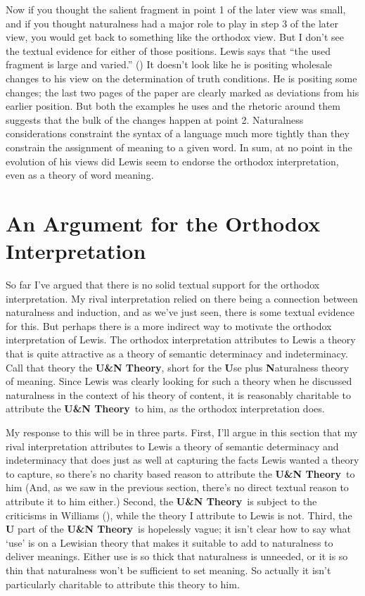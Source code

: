 \documentclass[
  11pt,
  letterpaper,
  DIV=11,
  numbers=noendperiod,
  twoside]{scrartcl}
\begin{document}
Now if you thought the salient fragment in point 1 of the later view was
small, and if you thought naturalness had a major role to play in step 3
of the later view, you would get back to something like the orthodox
view. But I don't see the textual evidence for either of those
positions. Lewis says that ``the used fragment is large and varied.''
() It doesn't look like he is
positing wholesale changes to his view on the determination of truth
conditions. He is positing some changes; the last two pages of the paper
are clearly marked as deviations from his earlier position. But both the
examples he uses and the rhetoric around them suggests that the bulk of
the changes happen at point 2. Naturalness considerations constraint the
syntax of a language much more tightly than they constrain the
assignment of meaning to a given word. In sum, at no point in the
evolution of his views did Lewis seem to endorse the orthodox
interpretation, even as a theory of word meaning.

\section{An Argument for the Orthodox
Interpretation}\label{an-argument-for-the-orthodox-interpretation}

So far I've argued that there is no solid textual support for the
orthodox interpretation. My rival interpretation relied on there being a
connection between naturalness and induction, and as we've just seen,
there is some textual evidence for this. But perhaps there is a more
indirect way to motivate the orthodox interpretation of Lewis. The
orthodox interpretation attributes to Lewis a theory that is quite
attractive as a theory of semantic determinacy and indeterminacy. Call
that theory the \textbf{U\&N Theory}, short for the \textbf{U}se plus
\textbf{N}aturalness theory of meaning. Since Lewis was clearly looking
for such a theory when he discussed naturalness in the context of his
theory of content, it is reasonably charitable to attribute the
\textbf{U\&N Theory}~to him, as the orthodox interpretation does.

My response to this will be in three parts. First, I'll argue in this
section that my rival interpretation attributes to Lewis a theory of
semantic determinacy and indeterminacy that does just as well at
capturing the facts Lewis wanted a theory to capture, so there's no
charity based reason to attribute the \textbf{U\&N Theory}~to him (And,
as we saw in the previous section, there's no direct textual reason to
attribute it to him either.) Second, the \textbf{U\&N Theory}~is subject
to the criticisms in Williams (), while
the theory I attribute to Lewis is not. Third, the \textbf{U} part of
the \textbf{U\&N Theory}~is hopelessly vague; it isn't clear how to say
what `use' is on a Lewisian theory that makes it suitable to add to
naturalness to deliver meanings. Either use is so thick that naturalness
is unneeded, or it is so thin that naturalness won't be sufficient to
set meaning. So actually it isn't particularly charitable to attribute
this theory to him.
\end{document}
